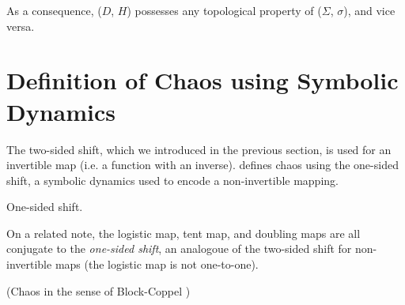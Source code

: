 \documentclass[12pt,twoside]{book}
\begin{document}
As a consequence, ($D$, $H$) possesses any topological property of ($\Sigma$, $\sigma$), and vice versa.



\section{Definition of Chaos using Symbolic Dynamics}
The two-sided shift, which we introduced in the previous section, is used for an invertible map (i.e. a function with an inverse).
\citet{blockcoppel} defines chaos using the one-sided shift, a symbolic dynamics used to encode a non-invertible mapping.
\begin{definition}
  One-sided shift.
\end{definition}
On a related note, the logistic map, tent map, and doubling maps are all conjugate to the \textit{one-sided shift}, an analogoue of the two-sided shift for non-invertible maps (the logistic map is not one-to-one).
\begin{definition}
  (Chaos in the sense of Block-Coppel \citep{blockcoppel})
  \label{defn:blockcoppel}
\end{definition}





\printindex
\end{document}
